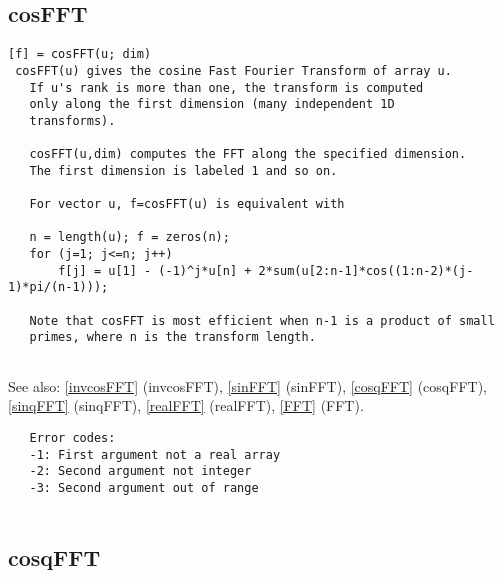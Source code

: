 \documentclass[a4paper]{article}
\begin{document}
\subsection{cosFFT\label{cosFFT}}

\begin{tscreen}
\begin{verbatim}
[f] = cosFFT(u; dim)
 cosFFT(u) gives the cosine Fast Fourier Transform of array u.
   If u's rank is more than one, the transform is computed
   only along the first dimension (many independent 1D
   transforms).

   cosFFT(u,dim) computes the FFT along the specified dimension.
   The first dimension is labeled 1 and so on.

   For vector u, f=cosFFT(u) is equivalent with

   n = length(u); f = zeros(n);
   for (j=1; j<=n; j++)
       f[j] = u[1] - (-1)^j*u[n] + 2*sum(u[2:n-1]*cos((1:n-2)*(j-1)*pi/(n-1)));

   Note that cosFFT is most efficient when n-1 is a product of small
   primes, where n is the transform length.
           
\end{verbatim}

See also: \ref{invcosFFT} {(invcosFFT)}, \ref{sinFFT} {(sinFFT)}, \ref{cosqFFT} {(cosqFFT)}, \ref{sinqFFT} {(sinqFFT)}, \ref{realFFT} {(realFFT)}, \ref{FFT} {(FFT)}.
\begin{verbatim}
   Error codes:
   -1: First argument not a real array
   -2: Second argument not integer
   -3: Second argument out of range
   
\end{verbatim}
\end{tscreen}



\subsection{cosqFFT\label{cosqFFT}}
\end{document}
